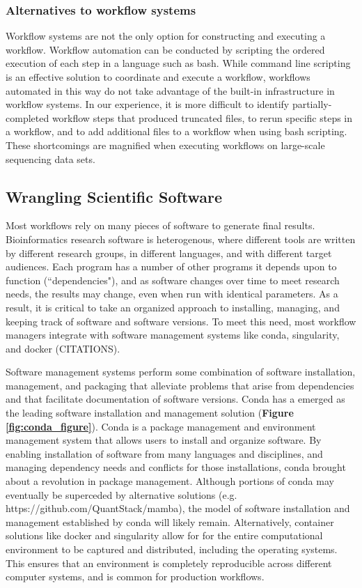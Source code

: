 \documentclass[10pt,letterpaper]{article}
\begin{document}
\subsubsection*{Alternatives to workflow systems}
Workflow systems are not the only option for constructing and executing a workflow.
Workflow automation can be conducted by scripting the ordered execution of each step in a language such as bash.
While command line scripting is an effective solution to coordinate and execute a workflow, workflows automated in this way do not take advantage of the built-in infrastructure in workflow systems.
In our experience, it is more difficult to identify partially-completed workflow steps that produced truncated files, to rerun specific steps in a workflow, and to add additional files to a workflow when using bash scripting.
These shortcomings are magnified when executing workflows on large-scale sequencing data sets.


\subsection*{Wrangling Scientific Software} 

Most workflows rely on many pieces of software to generate final results.
Bioinformatics research software is heterogenous, where different tools are written by different research groups, in different languages, and with different target audiences.
Each program has a number of other programs it depends upon to function (``dependencies"), and as software changes over time to meet research needs, the results may change, even when run with identical parameters. 
As a result, it is critical to take an organized approach to installing, managing, and keeping track of software and software versions. 
To meet this need, most workflow managers integrate with software management systems like conda, singularity, and docker (CITATIONS).

Software management systems perform some combination of software installation, management, and packaging that alleviate problems that arise from dependencies and that facilitate documentation of software versions.
Conda has a emerged as the leading software installation and management solution (\textbf{Figure \ref{fig:conda_figure}}). 
Conda is a package management and environment management system that allows users to install and organize software.
By enabling installation of software from many languages and disciplines, and managing dependency needs and conflicts for those installations, conda brought about a revolution in package management.
Although portions of conda may eventually be superceded by alternative solutions (e.g. https://github.com/QuantStack/mamba), the model of software installation and management established by conda will likely remain.
Alternatively, container solutions like docker and singularity allow for for the entire computational environment to be captured and distributed, including the operating systems. 
This ensures that an environment is completely reproducible across different computer systems, and is common for production workflows.
\end{document}
